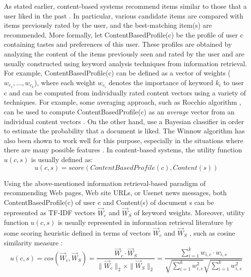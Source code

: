 As stated earlier, content-based systems recommend items similar to those that a user liked in the past  \citep{recom_56}  \citep{recom_69}  \citep{recom_77}. In particular, various candidate items are compared with items previously rated by the user, and the best-matching item(s) are recommended. More formally, let ContentBasedProfile(c) be the profile of user c containing tastes and preferences of this user. These profiles are obtained by analyzing the content of the items previously seen and rated by the user and are usually constructed using keyword analysis techniques from information retrieval. For example, ContentBasedProfile(c) can be defined as a vector of weights ($w_{c_1},...,w_{c_k}$), where each weight $w_{c_i}$ denotes the importance of keyword $k_i$ to user c and can be computed from individually rated content vectors using a variety of techniques. For example, some averaging approach, such as Rocchio algorithm  \citep{recom_85}, can be used to compute ContentBasedProfile(c) as an \textit{average} vector from an individual content vectors  \citep{recom_8}  \citep{recom_56}. On the other hand,  \citep{recom_77} use a Bayesian classifier in order to estimate the probability that a document is liked. The Winnow algorithm  \citep{recom_62} has also been shown to work well for this purpose, especially in the situations where there are many possible features  \citep{recom_76}.
In content-based systems, the utility function $u(c, s)$ is usually defined as:
\begin{equation}\label{eq:5}
u(c,s)= score(ContentBasedProfile(c),Content(s))
\end{equation}



Using the above-mentioned information retrieval-based paradigm of recommending Web pages, Web site URLs, or Usenet news messages, both ContentBasedProfile(c) of user c and Content(s) of document s can be represented as TF-IDF vectors $\vec{W}_c$   and $\vec{W}_S$ of keyword weights. Moreover, utility function $u(c, s)$ is usually represented in information retrieval literature by some scoring heuristic defined in terms of vectors $\vec{W}_c$   and $\vec{W}_S$ , such as cosine similarity measure \citep{recom_7} \citep{recom_89}:
\begin{equation}\label{eq:6}
	u(c,s) = cos(\vec{W}_c, \vec{W}_S) = \frac{\vec{W}_c \cdot \vec{W}_S}{ \|\vec{W}_c\|_2 \times \|\vec{W}_S\|_2} = 
	\frac{\sum\limits_{i=1}^k w_{i,c} \cdot w_{i,s}}{\sqrt{\sum\limits_{i=1}^k w_{i,c}^2} \sqrt{\sum\limits_{i=1}^k w_{i,s}^2}}
\end{equation}


